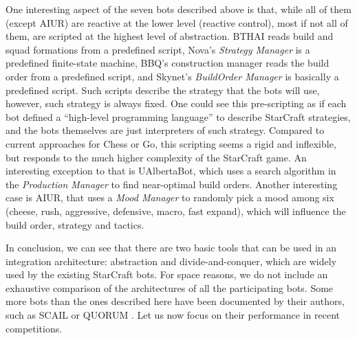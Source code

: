 \documentclass{llncs}
\begin{document}
One  interesting aspect  of the  seven bots  described above  is that,
while all  of them (except AIUR) are  reactive at the  lower level
(reactive  control), most  if not  all of  them, are  scripted  at the
highest level  of abstraction. BTHAI reads build  and squad formations
from  a  predefined  script,   Nova's  {\em  Strategy  Manager}  is  a
predefined finite-state machine,  BBQ's construction manager reads the
build  order from a  predefined script,  and Skynet's  {\em BuildOrder
  Manager} is basically a predefined script. Such scripts describe the
strategy  that the  bots will  use, however,  such strategy  is always
fixed.   One could see  this pre-scripting  as if  each bot  defined a
``high-level programming language''  to describe StarCraft strategies,
and   the   bots   themselves    are   just   interpreters   of   such
strategy.  Compared  to  current  approaches  for Chess  or  Go,  this
scripting  seems a  rigid and  inflexible,  but responds  to the  much
higher complexity of the  StarCraft game.  An interesting exception to
that  is  UAlbertaBot, which  uses  a  search  algorithm in  the  {\em
  Production  Manager}  to find  near-optimal  build orders.   Another
interesting case is  AIUR, that uses a {\em  Mood Manager} to randomly
pick  a mood among  six (cheese,  rush, aggressive,  defensive, macro,
fast  expand), which  will  influence the  build  order, strategy  and
tactics. %

In conclusion, we can see that there are two basic tools that can be used in an integration architecture: abstraction and divide-and-conquer, which are widely used by the existing StarCraft bots. For space reasons, we do not include an exhaustive comparison of the architectures of all the participating bots. Some more bots than the ones described here have been documented by their authors, such as SCAIL \cite{YoungSCAIL} or QUORUM \cite{young2012evolutionary}.
Let us now focus on their performance in recent competitions.


\end{document}
